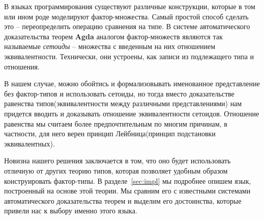 В языках программирования существуют различные конструкции, которые в том или ином роде моделируют фактор-множества. Самый простой способ сделать это -- переопределить операцию сравнения на типе. В системе автоматического доказательства теорем \textbf{Agda} аналогом фактор-множеств являются так называемые \textit{сетоиды} -- множества с введенным на них отношением эквивалентности. Технически, они устроены, как записи из подлежащего типа и отношения.

В нашем случае, можно обойтись и формализовывать именованное представление без фактор-типов и использовать сетоиды, но тогда вместо доказательстве равенства типов(эквивалентности между различными представлениями) нам придется вводить и доказывать отношение эквивалентности сетоидов. Отношение равенства мы считаем более предпочтительным по многим причинам, в частности, для него верен принцип Лейбница(принцип подстановки эквивалентных).

Новизна нашего решения заключается в том, что оно будет использовать отличную от других теорию типов, которая позволяет удобным образом конструировать фактор-типы. В разделе~\ref{sec:impl} мы подробнее опишем язык, построенный на основе этой теории. Мы сравним его с известными системами автоматического доказательства теорем и выделим его достоинства, которые привели нас к выбору именно этого языка.
